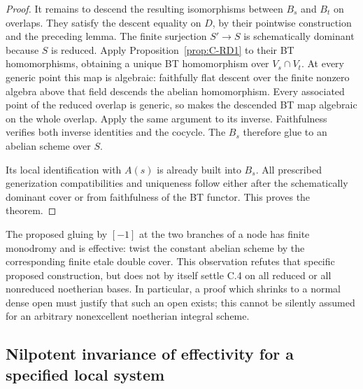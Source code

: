 \begin{proof}
It remains to descend the resulting isomorphisms between $B_s$ and
$B_t$ on overlaps. They satisfy the descent equality on $D$, by their
pointwise construction and the preceding lemma. The finite surjection
$S'\to S$ is schematically dominant because $S$ is reduced. Apply
Proposition~\ref{prop:C-RD1} to their BT homomorphisms, obtaining a
unique BT homomorphism over $V_s\cap V_t$. At every generic point
this map is algebraic: faithfully flat descent over the finite
nonzero algebra above that field descends the abelian homomorphism.
Every associated point of the reduced overlap is generic, so
\cite[Proposition~1.2, p.64]{Grothendieck1966Hom} makes the descended
BT map algebraic on the whole overlap. Apply the same argument to its
inverse. Faithfulness verifies both inverse identities and the
cocycle. The $B_s$ therefore glue to an abelian scheme over $S$.

Its local identification with $A(s)$ is already built into $B_s$.
All prescribed generization compatibilities and uniqueness follow
either after the schematically dominant cover or from faithfulness
of the BT functor. This proves the theorem.
\end{proof}

\begin{remark}\label{auto:C:63e1d81ef0f5}

The proposed gluing by $[-1]$ at the two branches of a node has finite
monodromy and is effective: twist the constant abelian scheme by the
corresponding finite etale double cover. This observation refutes that
specific proposed construction, but does not by itself settle C.4 on
all reduced or all nonreduced noetherian bases. In particular, a proof
which shrinks to a normal dense open must justify that such an open
exists; this cannot be silently assumed for an arbitrary nonexcellent
noetherian integral scheme.
\end{remark}

\subsection{Nilpotent invariance of effectivity for a specified local system}


